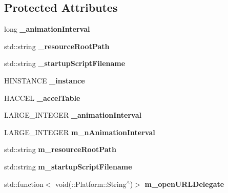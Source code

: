 \subsection*{Protected Attributes}
\begin{DoxyCompactItemize}
\item 
\mbox{\label{classApplication_ad5d48902e862303c5784d06f32962cc4}} 
long {\bfseries \+\_\+animation\+Interval}
\item 
\mbox{\label{classApplication_a811ff61602452a1e17ab9b297727d469}} 
std\+::string {\bfseries \+\_\+resource\+Root\+Path}
\item 
\mbox{\label{classApplication_a3eaeb5db8140a99f85fcb1a933abb26e}} 
std\+::string {\bfseries \+\_\+startup\+Script\+Filename}
\item 
\mbox{\label{classApplication_aa6bca0c02f5e29847c96d7418adf2668}} 
H\+I\+N\+S\+T\+A\+N\+CE {\bfseries \+\_\+instance}
\item 
\mbox{\label{classApplication_a130cadebf2a07cd0a1604893695e7eb4}} 
H\+A\+C\+C\+EL {\bfseries \+\_\+accel\+Table}
\item 
\mbox{\label{classApplication_ad5d48902e862303c5784d06f32962cc4}} 
L\+A\+R\+G\+E\+\_\+\+I\+N\+T\+E\+G\+ER {\bfseries \+\_\+animation\+Interval}
\item 
\mbox{\label{classApplication_ad95086af73928db7f795dc06c5416979}} 
L\+A\+R\+G\+E\+\_\+\+I\+N\+T\+E\+G\+ER {\bfseries m\+\_\+n\+Animation\+Interval}
\item 
\mbox{\label{classApplication_a83c65c5d1dc25d4537e5d185a5c27475}} 
std\+::string {\bfseries m\+\_\+resource\+Root\+Path}
\item 
\mbox{\label{classApplication_a7bfa139f3ccd1f3847548120857dc0bc}} 
std\+::string {\bfseries m\+\_\+startup\+Script\+Filename}
\item 
\mbox{\label{classApplication_a151a937d57419cdcd6d1bec60fec2528}} 
std\+::function$<$ void(\+::Platform\+::\+String$^\wedge$)$>$ {\bfseries m\+\_\+open\+U\+R\+L\+Delegate}
\end{DoxyCompactItemize}
